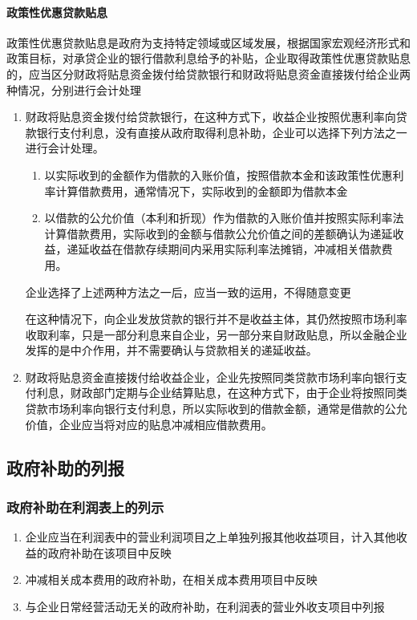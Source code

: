 \documentclass[UTF8,12pt]{ctexart}
\numberwithin{equation}{section} %
\numberwithin{figure}{section}
\numberwithin{table}{section}
\begin{document}
	\paragraph{政策性优惠贷款贴息}
	政策性优惠贷款贴息是政府为支持特定领域或区域发展，根据国家宏观经济形式和政策目标，对承贷企业的银行借款利息给予的补贴，企业取得政策性优惠贷款贴息的，应当区分财政将贴息资金拨付给贷款银行和财政将贴息资金直接拨付给企业两种情况，分别进行会计处理
	\begin{enumerate}
		\item 财政将贴息资金拨付给贷款银行，在这种方式下，收益企业按照优惠利率向贷款银行支付利息，没有直接从政府取得利息补助，企业可以选择下列方法之一进行会计处理。
		\begin{enumerate}
			\item 以实际收到的金额作为借款的入账价值，按照借款本金和该政策性优惠利率计算借款费用，通常情况下，实际收到的金额即为借款本金
			
			\item 以借款的公允价值（本利和折现）作为借款的入账价值并按照实际利率法计算借款费用，实际收到的金额与借款公允价值之间的差额确认为递延收益，递延收益在借款存续期间内采用实际利率法摊销，冲减相关借款费用。
		\end{enumerate}
		企业选择了上述两种方法之一后，应当一致的运用，不得随意变更
		
		在这种情况下，向企业发放贷款的银行并不是收益主体，其仍然按照市场利率收取利率，只是一部分利息来自企业，另一部分来自财政贴息，所以金融企业发挥的是中介作用，并不需要确认与贷款相关的递延收益。
		
		\item 财政将贴息资金直接拨付给收益企业，企业先按照同类贷款市场利率向银行支付利息，财政部门定期与企业结算贴息，在这种方式下，由于企业将按照同类贷款市场利率向银行支付利息，所以实际收到的借款金额，通常是借款的公允价值，企业应当将对应的贴息冲减相应借款费用。
	\end{enumerate}
	
	\subsection{政府补助的列报}
	\subsubsection{政府补助在利润表上的列示}
	\begin{enumerate}
		\item 企业应当在利润表中的营业利润项目之上单独列报其他收益项目，计入其他收益的政府补助在该项目中反映
		
		\item 冲减相关成本费用的政府补助，在相关成本费用项目中反映
		
		\item 与企业日常经营活动无关的政府补助，在利润表的营业外收支项目中列报
	\end{enumerate}
\end{document}
